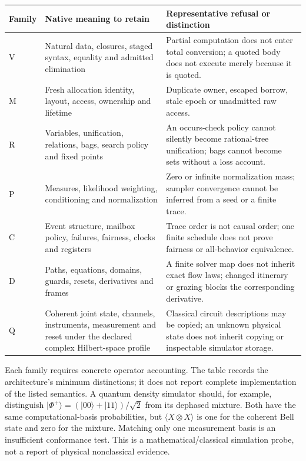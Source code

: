 \documentclass[11pt]{article}
\theoremstyle{remark}
\begin{document}
\begin{longtable}{P{.08\textwidth}P{.39\textwidth}P{.43\textwidth}}
\toprule
Family & Native meaning to retain & Representative refusal or distinction\\
\midrule\endhead
V & Natural data, closures, staged syntax, equality and admitted elimination &
Partial computation does not enter total conversion; a quoted body does not
execute merely because it is quoted.\\[.6em]
M & Fresh allocation identity, layout, access, ownership and lifetime &
Duplicate owner, escaped borrow, stale epoch or unadmitted raw access.\\[.6em]
R & Variables, unification, relations, bags, search policy and fixed points &
An occurs-check policy cannot silently become rational-tree unification;
bags cannot become sets without a loss account.\\[.6em]
P & Measures, likelihood weighting, conditioning and normalization &
Zero or infinite normalization mass; sampler convergence cannot be inferred
from a seed or a finite trace.\\[.6em]
C & Event structure, mailbox policy, failures, fairness, clocks and registers &
Trace order is not causal order; one finite schedule does not prove
fairness or all-behavior equivalence.\\[.6em]
D & Paths, equations, domains, guards, resets, derivatives and frames &
A finite solver map does not inherit exact flow laws; changed itinerary or
grazing blocks the corresponding derivative.\\[.6em]
Q & Coherent joint state, channels, instruments, measurement and reset under
the declared complex Hilbert-space profile &
Classical circuit descriptions may be copied; an unknown physical state
does not inherit copying or inspectable simulator storage.\\
\bottomrule
\end{longtable}

Each family requires concrete operator accounting. The table records the
architecture's minimum distinctions; it does not report complete implementation
of the listed semantics. A quantum density simulator should, for example,
distinguish $\lvert\Phi^+\rangle=(\lvert00\rangle+\lvert11\rangle)/\sqrt2$
from its dephased mixture. Both have the same computational-basis
probabilities, but $\langle X\otimes X\rangle$ is one for the coherent Bell
state and zero for the mixture. Matching only one measurement basis is an
insufficient conformance test. This is a mathematical/classical simulation
probe, not a report of physical nonclassical evidence.
\end{document}
